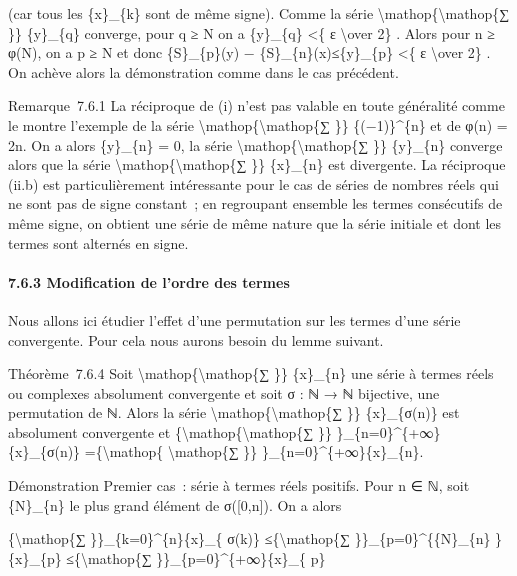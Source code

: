 \documentclass[]{article}
\begin{document}
(car tous les \{x\}\_\{k\} sont de même signe). Comme la série
\textbackslash{}mathop\{\textbackslash{}mathop\{∑ \}\} \{y\}\_\{q\}
converge, pour q ≥ N on a \textbar{}\{y\}\_\{q\}\textbar{} \textless{}\{
ε \textbackslash{}over 2\} . Alors pour n ≥ φ(N), on a p ≥ N et donc
\textbar{}\{S\}\_\{p\}(y) −
\{S\}\_\{n\}(x)\textbar{}≤\textbar{}\{y\}\_\{p\}\textbar{} \textless{}\{
ε \textbackslash{}over 2\} . On achève alors la démonstration comme dans
le cas précédent.

Remarque~7.6.1 La réciproque de (i) n'est pas valable en toute
généralité comme le montre l'exemple de la série
\textbackslash{}mathop\{\textbackslash{}mathop\{∑ \}\} \{(−1)\}\^{}\{n\}
et de φ(n) = 2n. On a alors \{y\}\_\{n\} = 0, la série
\textbackslash{}mathop\{\textbackslash{}mathop\{∑ \}\} \{y\}\_\{n\}
converge alors que la série
\textbackslash{}mathop\{\textbackslash{}mathop\{∑ \}\} \{x\}\_\{n\} est
divergente. La réciproque (ii.b) est particulièrement intéressante pour
le cas de séries de nombres réels qui ne sont pas de signe constant~; en
regroupant ensemble les termes consécutifs de même signe, on obtient une
série de même nature que la série initiale et dont les termes sont
alternés en signe.

\paragraph{7.6.3 Modification de l'ordre des termes}

Nous allons ici étudier l'effet d'une permutation sur les termes d'une
série convergente. Pour cela nous aurons besoin du lemme suivant.

Théorème~7.6.4 Soit \textbackslash{}mathop\{\textbackslash{}mathop\{∑
\}\} \{x\}\_\{n\} une série à termes réels ou complexes absolument
convergente et soit σ : ℕ → ℕ bijective, une permutation de ℕ. Alors la
série \textbackslash{}mathop\{\textbackslash{}mathop\{∑ \}\}
\{x\}\_\{σ(n)\} est absolument convergente et
\{\textbackslash{}mathop\{\textbackslash{}mathop\{∑ \}\}
\}\_\{n=0\}\^{}\{+∞\}\{x\}\_\{σ(n)\} =\{\textbackslash{}mathop\{
\textbackslash{}mathop\{∑ \}\} \}\_\{n=0\}\^{}\{+∞\}\{x\}\_\{n\}.

Démonstration Premier cas~: série à termes réels positifs. Pour n ∈ ℕ,
soit \{N\}\_\{n\} le plus grand élément de σ({[}0,n{]}). On a alors

\{\textbackslash{}mathop\{∑ \}\}\_\{k=0\}\^{}\{n\}\{x\}\_\{ σ(k)\}
≤\{\textbackslash{}mathop\{∑ \}\}\_\{p=0\}\^{}\{\{N\}\_\{n\}
\}\{x\}\_\{p\} ≤\{\textbackslash{}mathop\{∑
\}\}\_\{p=0\}\^{}\{+∞\}\{x\}\_\{ p\}
\end{document}
